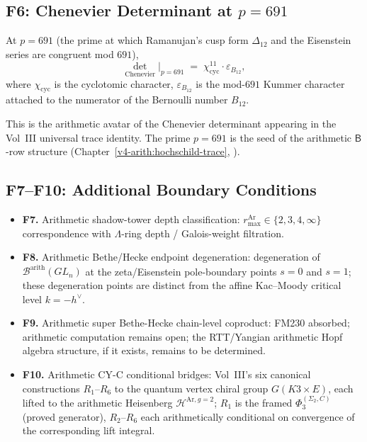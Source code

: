 \subsection{F6: Chenevier Determinant at \(p=691\)}
\label{v4-arith:of:F6-chenevier-691}

\begin{conjecture}
\label{v4-arith:conj:F6-chenevier-691}
At \(p=691\) (the prime at which Ramanujan's cusp form \(\Delta_{12}\)
and the Eisenstein series are congruent mod \(691\)),
\begin{equation}
\det_{\mathrm{Chenevier}}\bigl|_{p=691}\;=\;\chi_{\mathrm{cyc}}^{11}\cdot\varepsilon_{B_{12}},
\end{equation}
where \(\chi_{\mathrm{cyc}}\) is the cyclotomic character, \(\varepsilon_{B_{12}}\)
is the mod-\(691\) Kummer character attached to the numerator of the
Bernoulli number \(B_{12}\).
\end{conjecture}

\begin{remark}[connection]
This is the arithmetic avatar of the Chenevier determinant
appearing in the Vol~III universal trace identity. The prime
\(p=691\) is the seed of the arithmetic \(\mathsf{B}\)-row structure
(Chapter~\ref{v4-arith:hochschild-trace},
).
\end{remark}

\subsection{F7--F10: Additional Boundary Conditions}
\label{v4-arith:of:F7-F10}

\begin{itemize}
\item \textbf{F7.} Arithmetic shadow-tower depth classification:
\(r_{\max}^{\mathrm{Ar}}\in\{2,3,4,\infty\}\) correspondence with
\(\Lambda\)-ring depth / Galois-weight filtration.
\item \textbf{F8.} Arithmetic Bethe/Hecke endpoint degeneration:
degeneration of \(\mathcal{B}^{\mathrm{arith}}(GL_{n})\) at the
zeta/Eisenstein pole-boundary points \(s=0\) and \(s=1\); these
degeneration points are distinct from the affine Kac--Moody
critical level \(k=-h^{\vee}\).
\item \textbf{F9.} Arithmetic super Bethe-Hecke chain-level coproduct:
FM230 absorbed; arithmetic computation remains open; the
RTT/Yangian arithmetic Hopf algebra structure, if it exists, remains
to be determined.
\item \textbf{F10.} Arithmetic CY-C conditional bridges: Vol~III's
six canonical constructions \(R_1\)--\(R_6\)
to the quantum vertex chiral group \(G(K3\times E)\), each lifted
to the arithmetic Heisenberg \(\mathcal{H}^{\mathrm{Ar},g=2}\);
\(R_1\) is the framed \(\Phi_3^{(\Sigma_2,C)}\) (proved generator),
\(R_2\)--\(R_6\) each arithmetically conditional on convergence of
the corresponding lift integral.
\end{itemize}

